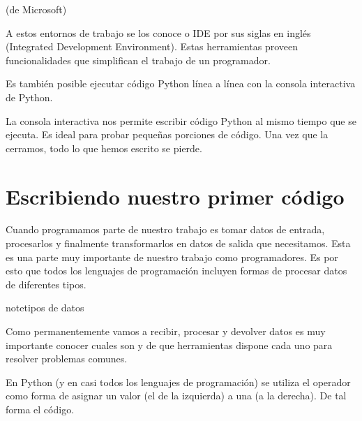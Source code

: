 \documentclass[a4paper,12pt,spanish]{sphinxmanual}
\begin{document}
\sphinxAtStartPar
{} (de Microsoft)

\noindent{}

\sphinxAtStartPar
A estos entornos de trabajo se los conoce  o
IDE por sus siglas en inglés (Integrated Development Environment).
Estas herramientas proveen funcionalidades que simplifican el trabajo de un programador.

\sphinxAtStartPar
Es también posible ejecutar código Python línea a línea con la consola interactiva de Python.

\noindent{}

\noindent{}

\sphinxAtStartPar
La consola interactiva nos permite escribir código Python al mismo tiempo que se ejecuta.
Es ideal para probar pequeñas porciones de código. Una vez que la cerramos, todo lo que
hemos escrito se pierde.

\sphinxstepscope


\chapter{Escribiendo nuestro primer código}
\label{\detokenize{interactivo:escribiendo-nuestro-primer-codigo}}\label{\detokenize{interactivo::doc}}
\sphinxAtStartPar
Cuando programamos parte de nuestro trabajo es tomar datos de entrada,
procesarlos y finalmente transformarlos en datos de salida que necesitamos.
Esta es una parte muy importante de nuestro trabajo como programadores. Es por
esto que todos los lenguajes de programación incluyen formas de procesar datos
de diferentes tipos.

\begin{sphinxadmonition}{note}{tipos de datos}

\sphinxAtStartPar
Como permanentemente vamos a recibir, procesar y devolver datos es muy importante
conocer cuales son y de que herramientas dispone cada uno para resolver problemas
comunes.
\end{sphinxadmonition}

\sphinxAtStartPar
En Python (y en casi todos los lenguajes de programación) se utiliza el
operador \sphinxcode{\sphinxupquote{=}} como forma de asignar un valor (el de la izquierda) a una 
(a la derecha). De tal forma el código.

\begin{sphinxVerbatim}[commandchars=\\\{\}]
  
\end{sphinxVerbatim}
\end{document}
